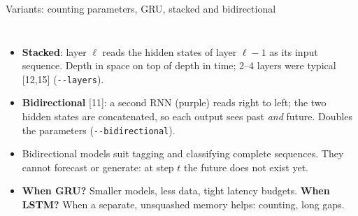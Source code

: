 \documentclass[aspectratio=169,10pt]{beamer}
\renewcommand{\cite}[1]{{\scriptsize\color{cTok}[#1]}}
\newcommand{\key}[1]{\textbf{\color{cAtt}#1}}
\begin{document}
\begin{frame}{Variants: counting parameters, GRU, stacked and bidirectional}
\begin{columns}[T,onlytextwidth]
\vspace{1mm}
\raggedright\footnotesize
\begin{itemize}
  \item \key{Stacked}: layer $\ell$ reads the hidden states of layer $\ell-1$ as its input sequence.
        Depth in space on top of depth in time; 2--4 layers were typical \cite{12,15}
        (\texttt{-{}-layers}).
  \item \key{Bidirectional} \cite{11}: a second RNN (purple) reads right to left; the two hidden
        states are concatenated, so each output sees past \emph{and} future. Doubles the
        parameters (\texttt{-{}-bidirectional}).
  \item Bidirectional models suit tagging and classifying complete sequences. They cannot
        forecast or generate: at step $t$ the future does not exist yet.
  \item \key{When GRU?} Smaller models, less data, tight latency budgets. \key{When LSTM?} When a
        separate, unsquashed memory helps: counting, long gaps.
\end{itemize}
\end{columns}
\end{frame}
\end{document}
